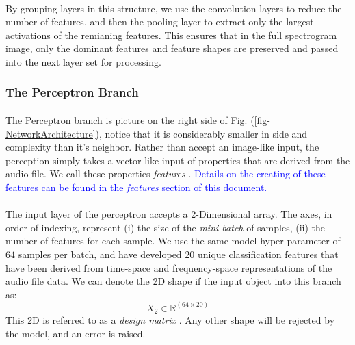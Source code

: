 \documentclass[12pt,letterpaper]{article}
\begin{document}
\paragraph*{}By grouping layers in this structure, we use the convolution  layers to reduce the number of features, and then the pooling layer to extract only the largest activations of the remianing features. This ensures that in the full spectrogram image, only the dominant features and feature shapes are preserved and passed into the next layer set for processing.


\subsubsection{The Perceptron Branch}

\paragraph*{} The Perceptron branch is picture on the right side of Fig. (\ref{fig-NetworkArchitecture}), notice that it is considerably smaller in side and complexity than it's neighbor. Rather than accept an image-like input, the perception simply takes a vector-like input of properties that are derived from the audio file. We call these properties \textit{features} \cite{Geron,Kahn,Serizel}. \textcolor{blue}{Details on the creating of these features can be found in the \textit{features} section of this document.}

\paragraph*{}The input layer of the perceptron accepts a 2-Dimensional array. The axes, in order of indexing, represent (i) the size of the \textit{mini-batch} of samples, (ii) the number of features for each sample. We use the same model hyper-parameter of $64$ samples per batch, and have developed $20$ unique classification features that have been derived from time-space and frequency-space representations of the audio file data. We can denote the 2D shape if the input object into this branch as:
\begin{equation}
\label{eqn-shapeX2}
X_2 \in \mathbb{R}^{(64 \times 20)}
\end{equation}
This 2D is referred to as a \textit{design matrix} \cite{James,Loy}. Any other shape will be rejected by the model, and an error is raised.
\end{document}

